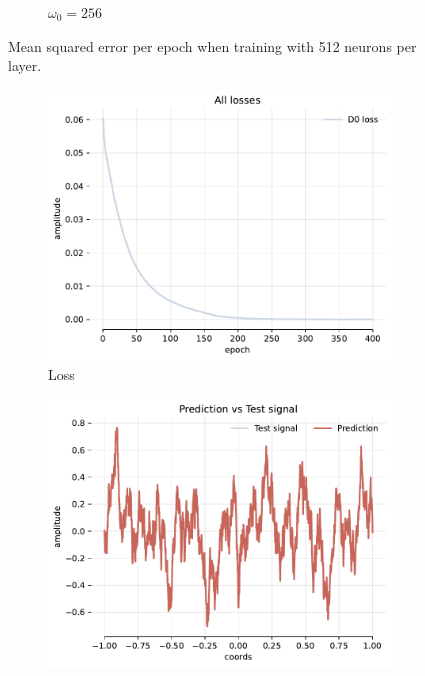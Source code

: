 \begin{figure}[h]
\begin{subfigure}[b]{0.45\textwidth}
        \caption{$\omega_0=256$}
        \label{fig:loss-hf512-w256}
    \end{subfigure}
    \caption{Mean squared error per epoch when training with 512 neurons per layer.}
    \label{f:loss-noise-comparison-hl0-hf512}
\end{figure}


\begin{figure}[h]
    \centering
    \begin{subfigure}[b]{0.32\textwidth}
        \centering
        \includegraphics[width=\textwidth]{img/ch3/loss-noise-hf4096-w512.pdf}
        \caption{Loss}
    \end{subfigure}
    \begin{subfigure}[b]{0.32\textwidth}
        \centering
        \includegraphics[width=\textwidth]{img/ch3/pred-noise-hf4096-w512.pdf}

\end{subfigure}
\end{figure}
